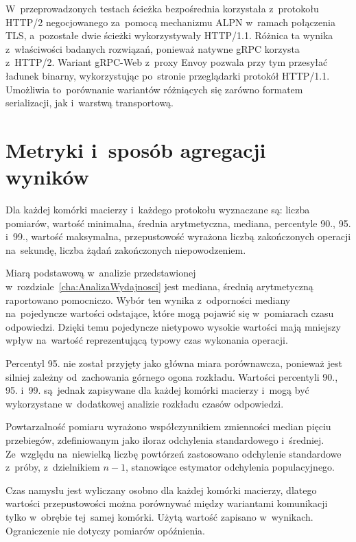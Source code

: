 W~przeprowadzonych testach ścieżka bezpośrednia korzystała z~protokołu
HTTP/2 negocjowanego za~pomocą mechanizmu ALPN w~ramach połączenia TLS,
a~pozostałe dwie ścieżki wykorzystywały HTTP/1.1. Różnica ta
wynika z~właściwości badanych rozwiązań, ponieważ natywne gRPC korzysta
z~HTTP/2. Wariant gRPC-Web z~proxy Envoy pozwala przy tym przesyłać
ładunek binarny, wykorzystując po~stronie przeglądarki protokół
HTTP/1.1. Umożliwia to~porównanie wariantów różniących się zarówno
formatem serializacji, jak i~warstwą transportową.

\section{Metryki i~sposób agregacji wyników}
\label{sec:Metryki}

Dla każdej komórki macierzy i~każdego protokołu wyznaczane są: liczba pomiarów, wartość minimalna, średnia arytmetyczna, mediana, percentyle 90., 95. i~99., wartość maksymalna, przepustowość wyrażona liczbą zakończonych operacji na~sekundę, liczba żądań zakończonych niepowodzeniem.

Miarą podstawową w~analizie przedstawionej w~rozdziale~\ref{cha:AnalizaWydajnosci} jest mediana, średnią arytmetyczną raportowano pomocniczo. Wybór ten wynika z~odporności mediany na~pojedyncze wartości odstające, które mogą pojawić się w~pomiarach czasu odpowiedzi. Dzięki temu pojedyncze nietypowo wysokie wartości mają mniejszy wpływ na~wartość reprezentującą typowy czas wykonania operacji.

Percentyl 95. nie został przyjęty jako główna miara porównawcza, ponieważ jest silniej zależny od~zachowania górnego ogona rozkładu. Wartości percentyli 90., 95. i~99. są~jednak zapisywane dla każdej komórki macierzy i~mogą być wykorzystane w~dodatkowej analizie rozkładu czasów odpowiedzi.

Powtarzalność pomiaru wyrażono współczynnikiem zmienności median pięciu przebiegów, zdefiniowanym jako iloraz odchylenia standardowego i~średniej. Ze~względu na~niewielką liczbę powtórzeń zastosowano odchylenie standardowe z~próby, z~dzielnikiem $n-1$, stanowiące estymator odchylenia populacyjnego.

Czas namysłu jest wyliczany osobno dla każdej komórki macierzy, dlatego wartości przepustowości można porównywać między wariantami komunikacji tylko w~obrębie tej~samej komórki. Użytą wartość zapisano w~wynikach. Ograniczenie nie dotyczy pomiarów opóźnienia.

